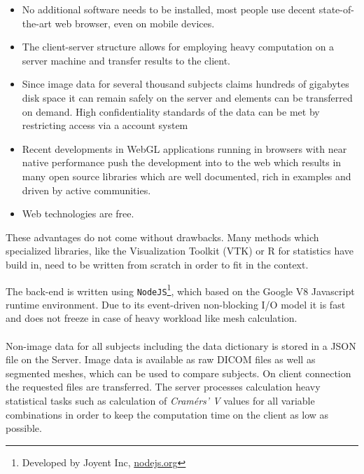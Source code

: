 \documentclass[journal]{style/vgtc} 			          %
\begin{document}
\begin{itemize}
	\item No additional software needs to be installed, most people use decent state-of-the-art web browser, even on mobile devices.
	\item The client-server structure allows for employing heavy computation on a server machine and transfer results to the client.
	\item Since image data for several thousand subjects claims hundreds of gigabytes disk space it can remain safely on the server and elements can be transferred on demand.
	High confidentiality standards of the data can be met by restricting access via a account system
	\item Recent developments in WebGL applications running in browsers with near native performance push the development into to the web which results in many open source libraries which are well documented, rich in examples and driven by active communities.
	\item Web technologies are free.
\end{itemize}
These advantages do not come without drawbacks.
%
Many methods which specialized libraries, like the Visualization Toolkit (VTK) or R for statistics have build in, need to be written from scratch in order to fit in the context.
%

The back-end is written using \texttt{NodeJS}\footnote{Developed by Joyent Inc, \url{nodejs.org}}, which based on the Google V8 Javascript runtime environment.
%
Due to its event-driven non-blocking I/O model it is fast and does not freeze in case of heavy workload like mesh calculation.
\\\\
Non-image data for all subjects including the data dictionary is stored in a JSON file on the Server.
%
Image data is available as raw DICOM files as well as segmented meshes, which can be used to compare subjects.
%
On client connection the requested files are transferred.
%
The server processes calculation heavy statistical tasks such as calculation of \emph{Cram\'{e}rs' V} values for all variable combinations in order to keep the computation time on the client as low as possible.
%
\end{document}
